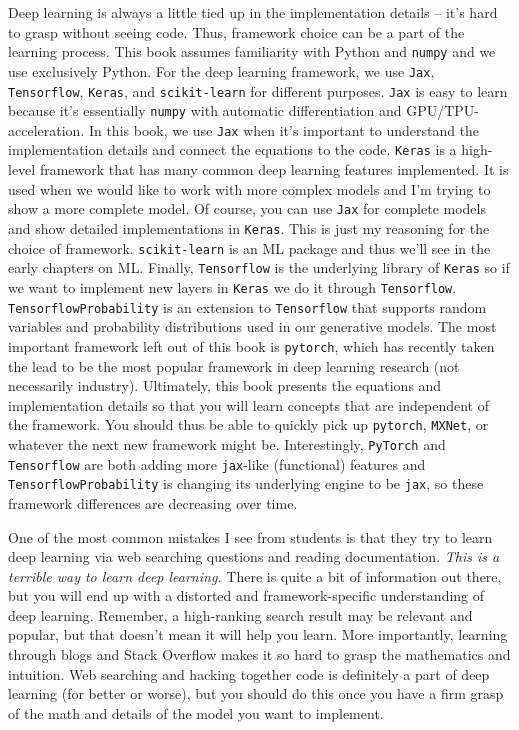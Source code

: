 \documentclass[9pt,pubversion,training]{livecoms}
\begin{document}
Deep learning is always a little tied up in the implementation details -- it's hard to grasp without seeing code. Thus, framework choice can be a part of the learning process. This book assumes familiarity with Python and \texttt{numpy} and we use exclusively Python. For the deep learning framework, we use \texttt{Jax}, \texttt{Tensorflow}, \texttt{Keras}, and \texttt{scikit-learn} for different purposes. \texttt{Jax} is easy to learn because it's essentially \texttt{numpy} with automatic differentiation and GPU/TPU-acceleration. In this book, we use \texttt{Jax} when it's important to understand the implementation details and connect the equations to the code. \texttt{Keras} is a high-level framework that has many common deep learning features implemented. It is used when we would like to work with more complex models and I'm trying to show a more complete model. Of course, you can use \texttt{Jax} for complete models and show detailed implementations in \texttt{Keras}. This is just my reasoning for the choice of framework. \texttt{scikit-learn} is an ML package and thus we'll see in the early chapters on ML. Finally, \texttt{Tensorflow} is the underlying library of \texttt{Keras} so if we want to implement new layers in \texttt{Keras} we do it through \texttt{Tensorflow}. \texttt{TensorflowProbability} is an extension to \texttt{Tensorflow} that supports random variables and probability distributions used in our generative models. The most important framework left out of this book is \texttt{pytorch}, which has recently taken the lead to be the most popular framework in deep learning research (not necessarily industry). Ultimately, this book presents the equations and implementation details so that you will learn concepts that are independent of the framework. You should thus be able to quickly pick up \texttt{pytorch}, \texttt{MXNet}, or whatever the next new framework might be. Interestingly, \texttt{PyTorch} and \texttt{Tensorflow} are both adding more \texttt{jax}-like (functional) features and \texttt{TensorflowProbability} is changing its underlying engine to be \texttt{jax}, so these framework differences are decreasing over time.

One of the most common mistakes I see from students is that they try to learn deep learning via web searching questions and reading documentation. \textit{This is a terrible way to learn deep learning.} There is quite a bit of information out there, but you will end up with a distorted and framework-specific understanding of deep learning. Remember, a high-ranking search result may be relevant and popular, but that doesn't mean it will help you learn. More importantly, learning through blogs and Stack Overflow makes it so hard to grasp the mathematics and intuition. Web searching and hacking together code is definitely a part of deep learning (for better or worse), but you should do this once you have a firm grasp of the math and details of the model you want to implement.
\end{document}
